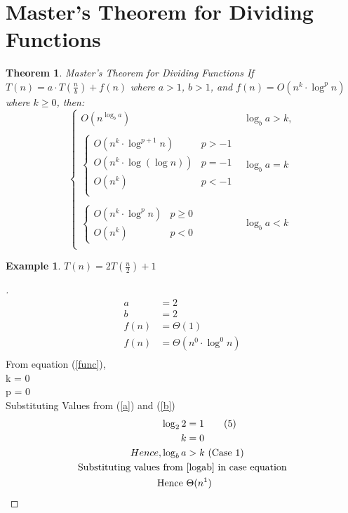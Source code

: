 \documentclass[]{article}
\theoremstyle{plain}
\newtheorem{thm}{Theorem}[section]
\theoremstyle{definition}
\newtheorem{lem}{Example}[thm]
\begin{document}
\section{Master's Theorem for Dividing Functions}
\begin{thm}{Master's Theorem for Dividing Functions}
    If $T(n) = a \cdot T\left(\frac{n}{b}\right) + f(n)$ where $a > 1$, $b > 1$, and $f(n) = O(n^k\cdot \log^p{n})$ where $k \geq 0$, then:
    \[
    \begin{cases}
        O(n^{\log_b{a}}) & \log_b{a} > k, \\\\
        \begin{cases}
            O(n^k \cdot \log^{p+1}{n}) & p > -1\\
            O(n^k \cdot \log{(\log{n})}) & p = -1\\
            O(n^k) & p < -1\\
        \end{cases} & \log_b{a} = k\\\\
        \begin{cases}
            O(n^k\cdot \log^p{n}) & p \geq 0\\
            O(n^k) & p < 0
        \end{cases} & \log_b{a} < k \\ 
    \end{cases}
    \]
\end{thm}

\begin{lem}
    $T(n) = 2T(\frac{n}{2}) + 1$
    \begin{proof}[]
        \begin{align*}
            a &= 2 \tag{1} \label{a}\\
            b &= 2 \tag{2} \label{b}\\
            f(n) &= \Theta(1)\\
            f(n) &= \Theta(n^0 \cdot \log^0{n}) \tag{4} \label{func}\\
        \end{align*}
        From equation ({\ref{func}}), \\
        \quad k = 0\\
        \quad p = 0\\
        Substituting Values from (\ref{a}) and (\ref{b})
        \begin{align*}
            \log_2{2} &= 1 \tag{5} \label{logab}\\
            k &= 0\\
            Hence, 
            \log_b{a} &> k \text{ (Case 1)}\\
            \text{Substituting values from }  &\text{{\ref{logab}} in case equation}\\
            \text{Hence } &\Theta(n^1)
        \end{align*}
    \end{proof}
\end{lem}
\end{document}
